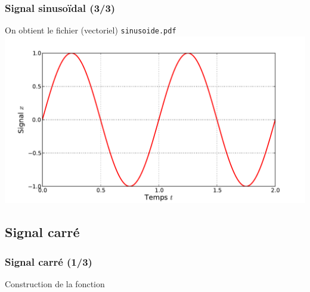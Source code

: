 \documentclass[8pt,a4paper]{beamer}
\begin{document}
  \begin{frame}[containsverbatim]
  \frametitle{Signal sinusoïdal (3/3)}
  On obtient le fichier (vectoriel) \lstinline!sinusoide.pdf!\\  
  \includegraphics[width=1.\textwidth]{figures/sinusoide.pdf}
  \end{frame}
  
  
%  
  
  
  \subsection{Signal carré}
  \begin{frame}[containsverbatim]
  \frametitle{Signal carré (1/3)}
  \begin{block}{Construction de la fonction} 
  
  \end{block}
  \end{frame}  
  
\end{document}
